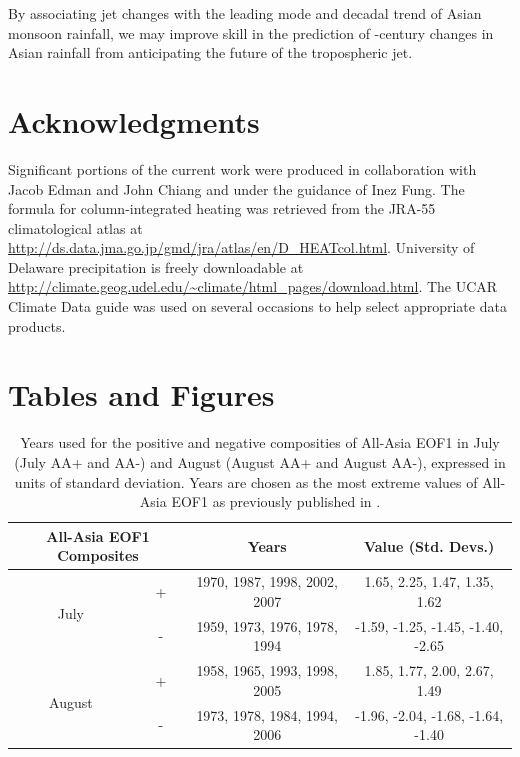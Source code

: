 	By associating jet changes with the leading mode and decadal trend of Asian monsoon rainfall, we may improve skill in the prediction of -century changes in Asian rainfall from anticipating the future of the tropospheric jet.

	
\section{Acknowledgments}

	Significant portions of the current work were produced in collaboration with Jacob Edman and John Chiang and under the guidance of Inez Fung. The formula for column-integrated heating was retrieved from the JRA-55 climatological atlas at \url{http://ds.data.jma.go.jp/gmd/jra/atlas/en/D_HEATcol.html}. University of Delaware precipitation is freely downloadable at \url{http://climate.geog.udel.edu/~climate/html_pages/download.html}. The UCAR Climate Data guide was used on several occasions to help select appropriate data products.

\clearpage
\newpage	
\section{Tables and Figures}


\begin{table}[p]

\caption{Years used for the positive and negative composities of All-Asia EOF1 in July (July AA+ and AA-) and August (August AA+ and August AA-), expressed in units of standard deviation. Years are chosen as the most extreme values of All-Asia EOF1 as previously published in \citet{Day2015}.}
\centering

\begin{tabular}{ c c c c}
	 	 		\multicolumn{2}{c}{All-Asia EOF1 Composites} 	&			Years				&		Value (Std. Devs.)			\tabularnewline	
				\hline
	 \multirow{2}{*}{July} 		&  +							&	1970, 1987, 1998, 2002, 2007 	&	1.65, 2.25, 1.47, 1.35, 1.62		\tabularnewline
	 						&  -							&	1959, 1973, 1976, 1978, 1994       &	-1.59, -1.25, -1.45, -1.40, -2.65	\tabularnewline
	 \multirow{2}{*}{August}	&  + 							&	1958, 1965, 1993, 1998, 2005	&	1.85, 1.77, 2.00, 2.67, 1.49		\tabularnewline
	 						&  -  							&	1973, 1978, 1984, 1994, 2006	&	-1.96, -2.04, -1.68, -1.64, -1.40 	\tabularnewline

\end{tabular}
\label{tab:t41}
\end{table}

